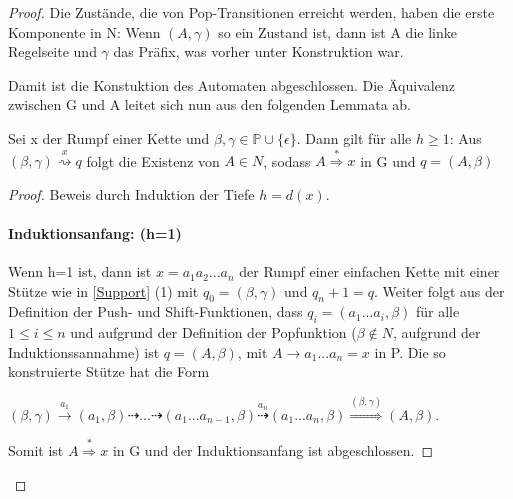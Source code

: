 \begin{proof}
Die Zustände, die von Pop-Transitionen erreicht werden, haben die erste Komponente in N: Wenn $(A, \gamma)$ so ein Zustand ist, dann ist A die linke Regelseite und $\gamma$ das Präfix, was vorher unter Konstruktion war.

Damit ist die Konstuktion des Automaten abgeschlossen. Die Äquivalenz zwischen G und A leitet sich nun aus den folgenden Lemmata ab.
\begin{lemma}
Sei x der Rumpf einer Kette und $\beta, \gamma \in \mathbb{P \cup \{ \epsilon\} }$. Dann gilt für alle $h \geq 1$: Aus $(\beta, \gamma) \stackrel{x}{\rightsquigarrow} q$ folgt die Existenz von $A\in N$, sodass $A\stackrel{*}{\Rightarrow}x$ in G und $q=(A, \beta)$
\end{lemma}
\begin{proof}
Beweis durch Induktion der Tiefe $h=d(x)$.
\paragraph*{Induktionsanfang: (h=1)}
Wenn h=1 ist, dann ist $x=a_1a_2...a_n$ der Rumpf einer einfachen Kette mit einer Stütze wie in \autoref{Support} (1) mit $q_0 = (\beta, \gamma)$ und $q_n+1=q$. Weiter folgt aus der Definition der Push- und Shift-Funktionen, dass $q_i=(a_1...a_i, \beta)$ für alle $1 \leq i \leq n$ und aufgrund der Definition der Popfunktion ($\beta \notin N$, aufgrund der Induktionssannahme) ist $q=(A, \beta)$, mit $A \rightarrow a_1...a_n=x$ in P. Die so konstruierte Stütze hat die Form 
\begin{center}
$(\beta, \gamma) \stackrel{a_1}{\rightarrow} (a_1, \beta) \dashrightarrow ... \dashrightarrow (a_1...a_{n-1}, \beta) \stackrel{a_n}{\dashrightarrow} (a_1...a_n, \beta) \stackrel{(\beta, \gamma)} {\Rightarrow} (A,\beta)$.
\end{center}
Somit ist $A\stackrel{*}{\Rightarrow}x$ in G und der Induktionsanfang ist abgeschlossen.

\end{proof}
\end{proof}
